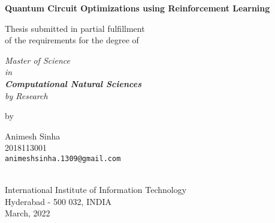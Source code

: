 \thispagestyle{empty}
\begin{center}
\vspace*{1.5cm}
{\Large \bf Quantum Circuit Optimizations using Reinforcement Learning}

\vspace*{3.75cm}
{\large Thesis submitted in partial fulfillment\\}
{\large  of the requirements for the degree of \\}

\vspace*{1cm}
{\it {\large Master of Science \\ in \\ \textbf{Computational Natural Sciences} \\ by Research}\\}
    

\vspace*{1cm}
{\large by}

\vspace*{5mm}
{\large Animesh Sinha\\}
{\large 2018113001\\
{\small \tt animeshsinha.1309@gmail.com}}


\vspace*{4.0cm}
{\\}
{\large International Institute of Information Technology\\}
{\large Hyderabad - 500 032, INDIA\\}
{\large March, 2022\\}
\end{center}